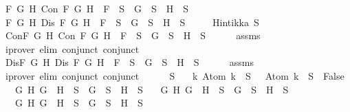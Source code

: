 \begin{isabellebody}
{\isasymand}\ {\isacharparenleft}{\isasymforall}F\ G\ H{\isachardot}\ Con\ F\ G\ H\ {\isasymlongrightarrow}\ F\ {\isasymin}\ S\ {\isasymlongrightarrow}\ G\ {\isasymin}\ S\ {\isasymand}\ H\ {\isasymin}\ S{\isacharparenright}\ \isanewline
{\isasymand}\ {\isacharparenleft}{\isasymforall}F\ G\ H{\isachardot}\ Dis\ F\ G\ H\ {\isasymlongrightarrow}\ F\ {\isasymin}\ S\ {\isasymlongrightarrow}\ G\ {\isasymin}\ S\ {\isasymor}\ H\ {\isasymin}\ S{\isacharparenright}{\isachardoublequoteclose}\ \ \isanewline
\ \ \ {\isachardoublequoteopen}Hintikka\ S{\isachardoublequoteclose}\isanewline
%
\isadelimproof
%
\endisadelimproof
%
\isatagproof
{}\isamarkupfalse%
\ {\isacharminus}\isanewline
\ \ \isamarkupfalse%
\ Con{\isacharcolon}{\isachardoublequoteopen}{\isasymforall}F\ G\ H{\isachardot}\ Con\ F\ G\ H\ {\isasymlongrightarrow}\ F\ {\isasymin}\ S\ {\isasymlongrightarrow}\ G\ {\isasymin}\ S\ {\isasymand}\ H\ {\isasymin}\ S{\isachardoublequoteclose}\isanewline
\ \ \ \ \isamarkupfalse%
\ assms\ \isamarkupfalse%
\ {\isacharparenleft}iprover\ elim{\isacharcolon}\ conjunct{}\ conjunct{}{\isacharparenright}\isanewline
\ \ \isamarkupfalse%
\ Dis{\isacharcolon}{\isachardoublequoteopen}{\isasymforall}F\ G\ H{\isachardot}\ Dis\ F\ G\ H\ {\isasymlongrightarrow}\ F\ {\isasymin}\ S\ {\isasymlongrightarrow}\ G\ {\isasymin}\ S\ {\isasymor}\ H\ {\isasymin}\ S{\isachardoublequoteclose}\isanewline
\ \ \ \ \isamarkupfalse%
\ assms\ \isamarkupfalse%
\ {\isacharparenleft}iprover\ elim{\isacharcolon}\ conjunct{}\ conjunct{}{\isacharparenright}\isanewline
\ \ \isamarkupfalse%
\ {\isachardoublequoteopen}{\isasymbottom}\ {\isasymnotin}\ S\isanewline
\ \ {\isasymand}\ {\isacharparenleft}{\isasymforall}k{\isachardot}\ Atom\ k\ {\isasymin}\ S\ {\isasymlongrightarrow}\ \isactrlbold {\isasymnot}\ {\isacharparenleft}Atom\ k{\isacharparenright}\ {\isasymin}\ S\ {\isasymlongrightarrow}\ False{\isacharparenright}\isanewline
\ \ {\isasymand}\ {\isacharparenleft}{\isasymforall}G\ H{\isachardot}\ G\ \isactrlbold {\isasymand}\ H\ {\isasymin}\ S\ {\isasymlongrightarrow}\ G\ {\isasymin}\ S\ {\isasymand}\ H\ {\isasymin}\ S{\isacharparenright}\isanewline
\ \ {\isasymand}\ {\isacharparenleft}{\isasymforall}G\ H{\isachardot}\ G\ \isactrlbold {\isasymor}\ H\ {\isasymin}\ S\ {\isasymlongrightarrow}\ G\ {\isasymin}\ S\ {\isasymor}\ H\ {\isasymin}\ S{\isacharparenright}\isanewline
\ \ {\isasymand}\ {\isacharparenleft}{\isasymforall}G\ H{\isachardot}\ G\ \isactrlbold {\isasymrightarrow}\ H\ {\isasymin}\ S\ {\isasymlongrightarrow}\ \isactrlbold {\isasymnot}G\ {\isasymin}\ S\ {\isasymor}\ H\ {\isasymin}\ S{\isacharparenright}\isanewline

\end{isabellebody}
